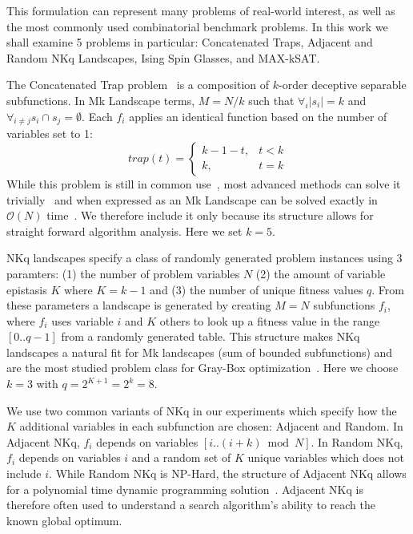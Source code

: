 \documentclass[runningheads,a4paper]{llncs}
\newcommand{\BigO}[1]{$\mathcal{O}{(#1)}$}
\begin{document}
This formulation can represent many problems of real-world interest, as well as
the most commonly used combinatorial benchmark problems. In this work we shall
examine 5 problems in particular: Concatenated Traps, Adjacent and Random NKq Landscapes,
Ising Spin Glasses, and MAX-kSAT.

The Concatenated Trap problem~\cite{deb:1992:trap} is a composition of $k$-order deceptive
separable subfunctions. In Mk Landscape terms, $M=N/k$ such that $\forall_i |s_i| = k$ and
$\forall_{i \neq j} s_i \cap s_j = \emptyset$. Each $f_i$ applies an identical function based
on the number of variables set to 1:
\begin{equation}
   trap(t) = \left\{
     \begin{array}{rl}
       k-1-t, &  t<k\\
       k,   &  t = k
     \end{array}
   \right.
  \label{eq-trap}
\end{equation}
While this problem is still in common use~\cite{hsu:2015:dsmgaII,inoue:2015:adaptivep3},
most advanced methods can solve it trivially~\cite{goldman:2012:ltga} and when expressed
as an Mk Landscape can be solved exactly in \BigO{N} time~\cite{whitley:2015:mk}.
We therefore include it only because its structure allows for straight forward algorithm analysis.
Here we set $k=5$.

NKq landscapes specify a class of randomly generated problem instances using 3 paramters:
(1) the number of problem variables $N$ (2) the amount of variable epistasis $K$ where $K=k-1$
and (3) the number of unique fitness values $q$. From these parameters a landscape is generated
by creating $M=N$ subfunctions $f_i$, where $f_i$ uses variable $i$ and $K$ others to look up
a fitness value in the range $[0..q-1]$ from a randomly generated table. This structure
makes NKq landscapes a natural fit for Mk landscapes (sum of bounded subfunctions)
and are the most studied problem class for Gray-Box
optimization~\cite{whitley:2012:constant,chicano:2014:ball,goldman:2015:GBO,tintos:2015:partitioncross,ochoa:2015:crossovernetworks,whitley:2015:mk}.
Here we choose $k=3$ with $q=2^{K+1}=2^{k}=8$.

We use two common variants of NKq in our experiments which specify how the $K$ additional
variables in each subfunction are chosen: Adjacent and Random. In Adjacent NKq, $f_i$ depends
on variables $[i..(i+k) \bmod N]$. In Random NKq, $f_i$ depends on variables $i$ and a random
set of $K$ unique variables which does not include $i$. While Random NKq is NP-Hard,
the structure of Adjacent NKq allows for a polynomial time dynamic programming solution~\cite{wright:2000:solvingnk}.
Adjacent NKq is therefore often used to understand a search algorithm's ability to reach the known global
optimum.
\end{document}
